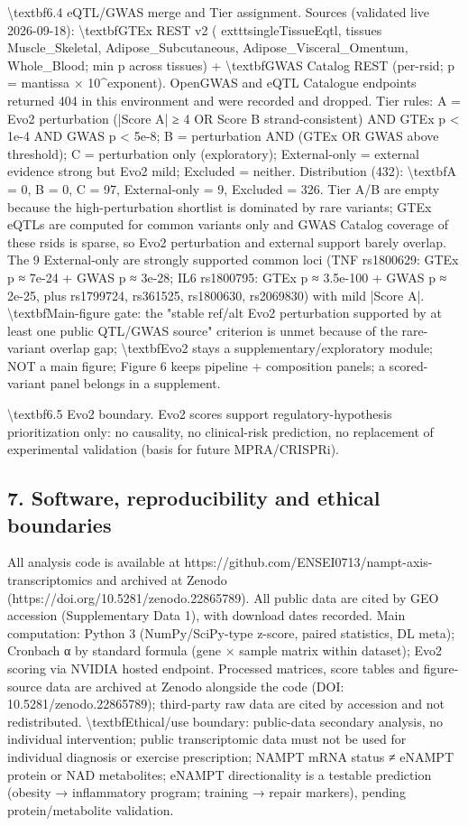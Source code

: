 \documentclass[11pt]{article}
\begin{document}
\textbackslash{}textbf{6.4 eQTL/GWAS merge and Tier assignment.} Sources (validated live 2026-09-18): \textbackslash{}textbf{GTEx REST v2} (	exttt{singleTissueEqtl}, tissues Muscle\_Skeletal, Adipose\_Subcutaneous, Adipose\_Visceral\_Omentum, Whole\_Blood; min p across tissues) + \textbackslash{}textbf{GWAS Catalog REST} (per-rsid; p = mantissa × 10\textasciicircum{}exponent). OpenGWAS and eQTL Catalogue endpoints returned 404 in this environment and were recorded and dropped. Tier rules: A = Evo2 perturbation (|Score A| ≥ 4 OR Score B strand-consistent) AND GTEx p < 1e-4 AND GWAS p < 5e-8; B = perturbation AND (GTEx OR GWAS above threshold); C = perturbation only (exploratory); External-only = external evidence strong but Evo2 mild; Excluded = neither. Distribution (432): \textbackslash{}textbf{A = 0, B = 0, C = 97, External-only = 9, Excluded = 326}. Tier A/B are empty because the high-perturbation shortlist is dominated by rare variants; GTEx eQTLs are computed for common variants only and GWAS Catalog coverage of these rsids is sparse, so Evo2 perturbation and external support barely overlap. The 9 External-only are strongly supported common loci (TNF rs1800629: GTEx p ≈ 7e-24 + GWAS p ≈ 3e-28; IL6 rs1800795: GTEx p ≈ 3.5e-100 + GWAS p ≈ 2e-25, plus rs1799724, rs361525, rs1800630, rs2069830) with mild |Score A|. \textbackslash{}textbf{Main-figure gate}: the "stable ref/alt Evo2 perturbation supported by at least one public QTL/GWAS source" criterion is unmet because of the rare-variant overlap gap; \textbackslash{}textbf{Evo2 stays a supplementary/exploratory module; NOT a main figure}; Figure 6 keeps pipeline + composition panels; a scored-variant panel belongs in a supplement.

\textbackslash{}textbf{6.5 Evo2 boundary.} Evo2 scores support regulatory-hypothesis prioritization only: no causality, no clinical-risk prediction, no replacement of experimental validation (basis for future MPRA/CRISPRi).

\subsection*{7. Software, reproducibility and ethical boundaries}
All analysis code is available at https://github.com/ENSEI0713/nampt-axis-transcriptomics and archived at Zenodo (https://doi.org/10.5281/zenodo.22865789). All public data are cited by GEO accession (Supplementary Data 1), with download dates recorded. Main computation: Python 3 (NumPy/SciPy-type z-score, paired statistics, DL meta); Cronbach α by standard formula (gene × sample matrix within dataset); Evo2 scoring via NVIDIA hosted endpoint. Processed matrices, score tables and figure-source data are archived at Zenodo alongside the code (DOI: 10.5281/zenodo.22865789); third-party raw data are cited by accession and not redistributed. \textbackslash{}textbf{Ethical/use boundary}: public-data secondary analysis, no individual intervention; public transcriptomic data must not be used for individual diagnosis or exercise prescription; NAMPT mRNA status ≠ eNAMPT protein or NAD metabolites; eNAMPT directionality is a testable prediction (obesity → inflammatory program; training → repair markers), pending protein/metabolite validation.
\end{document}
